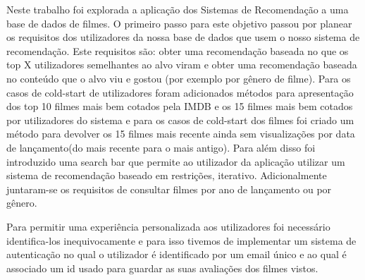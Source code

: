 Neste trabalho foi explorada a aplicação dos Sistemas de Recomendação a uma base de dados de filmes. O primeiro passo para este objetivo passou por planear os requisitos dos utilizadores da nossa base de dados que usem o nosso sistema de recomendação. Este requisitos são: obter uma recomendação baseada no que os top X utilizadores semelhantes ao alvo viram e obter uma recomendação baseada no conteúdo que o alvo viu e gostou (por exemplo por gênero de filme). Para os casos de cold-start de utilizadores foram adicionados métodos para apresentação dos top 10 filmes mais bem cotados pela IMDB e os 15 filmes mais bem cotados por utilizadores do sistema e para os casos de cold-start dos filmes foi criado um método para devolver os 15 filmes mais recente ainda sem visualizações por data de lançamento(do mais recente para o mais antigo). Para além disso foi introduzido uma search bar que permite ao utilizador da aplicação utilizar um sistema de recomendação baseado em restrições, iterativo. Adicionalmente juntaram-se os requisitos de consultar filmes por ano de lançamento ou por gênero.
\par Para permitir uma experiência personalizada aos utilizadores foi necessário identifica-los inequivocamente e para isso tivemos de implementar um sistema de autenticação no qual o utilizador é identificado por um email único e ao qual é associado um id usado para guardar as suas avaliações dos filmes vistos.

\newpage

